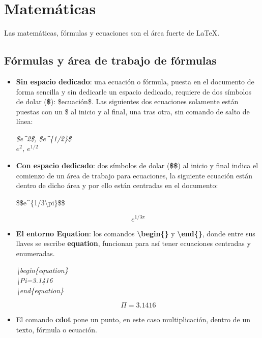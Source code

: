 \section{Matemáticas}

Las matemáticas, fórmulas y ecuaciones son el área fuerte de \LaTeX.


\subsection{Fórmulas y área de trabajo de fórmulas}
\begin{itemize}
    \item \textbf{Sin espacio dedicado}: una ecuación o fórmula, puesta en el documento de forma sencilla y sin dedicarle un espacio dedicado, requiere de dos símbolos de dolar (\textbf{\$}): \$ecuación\$. Las siguientes dos ecuaciones solamente están puestas con un \$ al inicio y al final, una tras otra, sin comando de salto de línea:
    \begin{center}
        \textit{
            \$e\textasciicircum{2}\$, \$e\textasciicircum{\{1/2\}}\$ \\
            $e^2$, $e^{1/2}$
        }
    \end{center}
    \item \textbf{Con espacio dedicado}: dos símbolos de dolar (\textbf{\$\$}) al inicio y final indica el comienzo de un área de trabajo para ecuaciones, la siguiente ecuación están dentro de dicho área y por ello están centradas en el documento:
    \begin{center}
        \$\$e\textasciicircum\{1/3\textbackslash{pi}\}\$\$
    \end{center}
    $$e^{1/3\pi}$$
    \item \textbf{El entorno Equation}: los comandos \textbf{\textbackslash{begin\{\}}} y \textbf{\textbackslash{end\{\}}}, donde entre sus llaves se escribe \textbf{equation}, funcionan para así tener ecuaciones centradas y enumeradas.
    \begin{center}
        \textit{
            \textbackslash{begin\{equation\}} \\
            \textbackslash{Pi}=3.1416 \\
            \textbackslash{end\{equation\}}}
    \end{center}
    \begin{equation}
        \label{ec: 3}
        \Pi=3.1416
    \end{equation}
    \item El comando \textbf{cdot} pone un punto, en este caso multiplicación, dentro de un texto, fórmula o ecuación.

\end{itemize}
